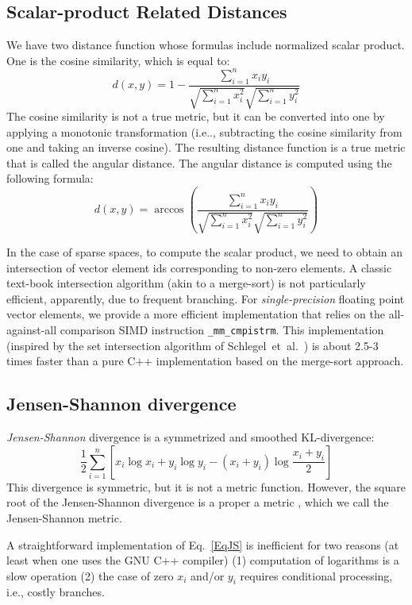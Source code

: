 \documentclass[runningheads,a4paper]{llncs}
\begin{document}
{\subsection{Scalar-product Related Distances}
We have two distance function whose formulas include normalized scalar product.
One is the cosine similarity, which is equal to:
$$
d(x,y) =1-\frac{\sum_{i=1}^n x_i y_i} 
{\sqrt{\sum_{i=1}^n x_i^2} \sqrt{\sum_{i=1}^n y_i^2 } } 
$$ 
The cosine similarity is not a true metric, but it can be converted into
one by applying a monotonic transformation (i.e.., subtracting the 
cosine similarity from one and taking an inverse cosine).
The resulting distance function is a true metric that 
is called the angular distance.
The angular distance is computed using the following formula:
$$
d(x,y) =\arccos\left(\frac{\sum_{i=1}^n x_i y_i} 
{\sqrt{\sum_{i=1}^n x_i^2} \sqrt{\sum_{i=1}^n y_i^2 } }\right) 
$$ 

In the case of sparse spaces, to compute the scalar product,
we need to obtain an intersection of vector element ids
corresponding to non-zero elements.
A classic text-book intersection algorithm (akin to a merge-sort)
is not particularly efficient, apparently,
due to frequent branching.
For \emph{single-precision} floating point vector elements,
we provide a more efficient implementation that relies on the 
all-against-all comparison SIMD instruction \texttt{\_mm\_cmpistrm}.
This implementation  (inspired by the set intersection algorithm of Schlegel~et~al.~\cite{schlegel2011fast})
is about 2.5-3 times faster than a pure C++ implementation based on the merge-sort approach.

\subsection{Jensen-Shannon divergence}\label{SectionJS}
\emph{Jensen-Shannon} divergence is a symmetrized and smoothed KL-divergence:
\begin{equation}\label{EqJS}
\frac{1}{2}\sum_{i=1}^n\left[ x_i \log x_i + y_i \log y_i  -(x_i+y_i)\log \frac{x_i +y_i}{2}\right]
\end{equation}
This divergence is symmetric, but it is not a metric function.
However, the square root of the Jensen-Shannon divergence
is a proper a metric \cite{endres2003new},
which we call the Jensen-Shannon metric.

A straightforward implementation of Eq.~\ref{EqJS} is inefficient for two reasons 
(at least when one uses the GNU C++ compiler)
(1) computation of logarithms is a slow operation (2)
the case of zero $x_i$ and/or $y_i$ requires conditional processing, i.e.,
costly branches.

}
\end{document}
